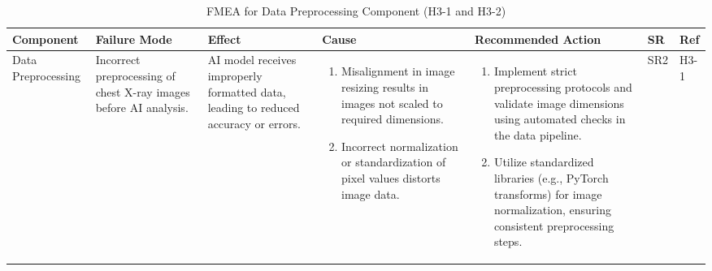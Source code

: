 \documentclass{article}
\begin{document}
\begin{landscape}
    \begin{table}[ht]
    \centering
    \caption{FMEA for Data Preprocessing Component (H3-1 and H3-2)}
    \renewcommand{\arraystretch}{1.1}
    {
    \setlength{\tabcolsep}{2pt}
    \begin{tabular}{|p{2.5cm}|p{2.5cm}|p{3cm}|p{5cm}|p{6cm}|p{1cm}|p{1cm}|}
    \hline
    \textbf{Component} & \textbf{Failure Mode} & \textbf{Effect} & \textbf{Cause} & \textbf{Recommended Action} & \textbf{SR} & \textbf{Ref} \\
    \hline

    Data Preprocessing
     & Incorrect preprocessing of chest X-ray images before AI analysis.
     & AI model receives improperly formatted data, leading to reduced accuracy or errors.
     &
     \begin{enumerate}[leftmargin=*, label={\alph*.}, itemsep=1pt]
         \item Misalignment in image resizing results in images not scaled to required dimensions.
         \item Incorrect normalization or standardization of pixel values distorts image data.
     \end{enumerate}
     &
     \begin{enumerate}[leftmargin=*, label={\alph*.}, itemsep=1pt]
         \item Implement strict preprocessing protocols and validate image dimensions using automated checks in the data pipeline.
         \item Utilize standardized libraries (e.g., PyTorch transforms) for image normalization, ensuring consistent preprocessing steps.
     \end{enumerate}
     & SR2 & H3-1 \\ \hline


\end{tabular}}
\end{table}
\end{landscape}
\end{document}
